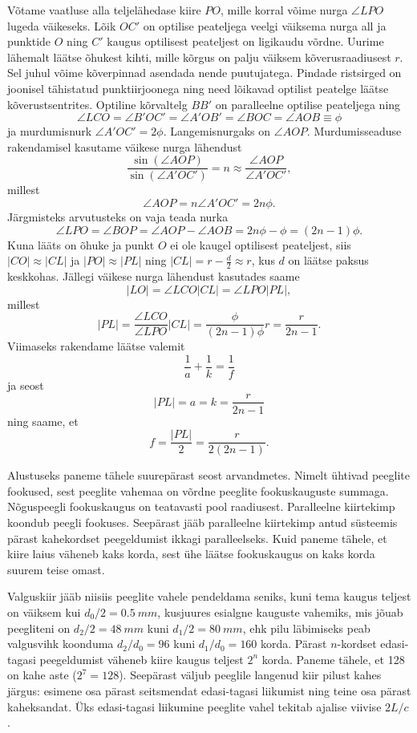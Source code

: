 \documentclass[10pt, twoside]{article}
\begin{document}
{Võtame vaatluse alla teljelähedase kiire $PO$, mille korral võime nurga $\angle LPO$ lugeda väikeseks. Lõik $OC'$ on optilise peateljega veelgi väiksema nurga all ja punktide $O$ ning $C'$ kaugus optilisest peateljest on ligikaudu võrdne. Uurime lähemalt läätse õhukest kihti, mille kõrgus on palju väiksem kõverusraadiusest $r$. Sel juhul võime kõverpinnad asendada nende puutujatega. Pindade ristsirged on joonisel tähistatud punktiirjoonega ning need lõikavad optilist peatelge läätse kõverustsentrites. Optiline kõrvaltelg $BB'$ on paralleelne optilise peateljega ning 
\[
\angle LCO=\angle B'OC'=\angle A'OB'=\angle BOC=\angle AOB\equiv \phi
\]
ja murdumisnurk $\angle A'OC'=2\phi$. Langemisnurgaks on $\angle AOP$. Murdumisseaduse rakendamisel kasutame väikese nurga lähendust 
\[
\frac{\sin(\angle AOP)}{\sin(\angle A'OC')}=n\approx \frac{\angle AOP}{\angle A'OC'},
\]
millest
\[
\angle AOP = n \angle A'OC'=2n\phi.
\]
Järgmisteks arvutusteks on vaja teada nurka
\[
\angle LPO=\angle BOP=\angle AOP - \angle AOB=2n\phi-\phi=(2n-1)\phi.
\]
Kuna lääts on õhuke ja punkt $O$ ei ole kaugel optilisest peateljest, siis $|CO|\approx|CL|$ ja $|PO|\approx|PL|$ ning $|CL|=r-\frac{d}{2}\approx r$, kus $d$ on läätse paksus keskkohas. Jällegi väikese nurga lähendust kasutades saame
\[
|LO|=\angle LCO|CL|=\angle LPO|PL|,
\]
millest
\[
|PL|=\frac{\angle LCO}{\angle LPO}|CL|=\frac{\phi}{(2n-1)\phi} r=\frac{r}{2n-1}.
\]
Viimaseks rakendame läätse valemit
\[
\frac{1}{a}+\frac{1}{k}=\frac{1}{f}
\]
ja seost
\[
|PL|=a=k=\frac{r}{2n-1}
\]
ning saame, et
\[
f=\frac{|PL|}{2}=\frac{r}{2(2n-1)}.
\]
\probend
\bigskip


\solu
Alustuseks paneme tähele suurepärast seost arvandmetes. Nimelt ühtivad peeglite fookused, sest peeglite vahemaa on võrdne peeglite fookuskauguste summaga. Nõguspeegli fookuskaugus on teatavasti pool raadiusest. Paralleelne kiirtekimp koondub peegli fookuses. Seepärast jääb paralleelne kiirtekimp antud süsteemis pärast kahekordset peegeldumist ikkagi paralleelseks. Kuid paneme tähele, et kiire laius väheneb kaks korda, sest ühe läätse fookuskaugus on kaks korda suurem teise omast.

Valguskiir jääb niisiis peeglite vahele pendeldama seniks, kuni tema kaugus teljest on väiksem kui $d_0/2 = \SI{0.5}{mm}$, kusjuures esialgne kauguste vahemiks, mis jõuab peegliteni on $d_2/2 = \SI{48}{mm}$ kuni $d_1/2 = \SI{80}{mm}$, ehk pilu läbimiseks peab valgusvihk koonduma $d_2/d_0 = 96$ kuni $d_1/d_0 = 160$ korda. Pärast $n$-kordset edasi-tagasi peegeldumist väheneb kiire kaugus teljest $2^n$ korda. Paneme tähele, et 128 on kahe aste ($2^7 = 128$). Seepärast väljub peeglile langenud kiir pilust kahes järgus: esimene osa pärast seitsmendat edasi-tagasi liikumist ning teine osa pärast kaheksandat. Üks edasi-tagasi liikumine peeglite vahel tekitab ajalise viivise $2L/c$.

}
\end{document}
